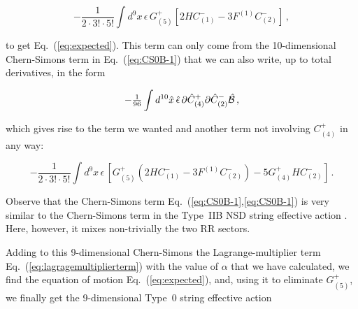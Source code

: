 \documentclass[12pt,a4paper]{article}
\begin{document}
\begin{equation}
-{\textstyle\frac{1}{2\cdot 3!\cdot5!}}\int d^{9}x\, \epsilon\, G^{+}_{(5)}
\left[2HC^{-}_{(1)}-3F^{(1)}C^{-}_{(2)}\right]\, ,
\end{equation}

\noindent to get Eq.~(\ref{eq:expected}). This term can only come
from the 10-dimensional Chern-Simons term in
Eq.~(\ref{eq:CS0B-1}) that we can also write, up to total derivatives,
in the form

\begin{equation}
\label{eq:CS0B-2}
-{\textstyle\frac{1}{96}} \int d^{10}\hat{x}\, 
\hat{\epsilon}\,
\partial\hat{C}^{+}_{(4)}\partial\hat{C}^{-}_{(2)}\hat{\cal B}\, ,
\end{equation}

\noindent which gives rise to the term we wanted and another term 
not involving $C^{+}_{(4)}$ in any way:

\begin{equation}
-{\textstyle\frac{1}{2\cdot 3!\cdot 5!}} \int d^{9}x\,
\epsilon\,
\left[G^{+}_{(5)}\left(2HC^{-}_{(1)} -3F^{(1)}C^{-}_{(2)}\right) 
-5G^{+}_{(4)}HC^{-}_{(2)}
\right]\, .
\end{equation}

Observe that the Chern-Simons term
Eq.~(\ref{eq:CS0B-1},\ref{eq:CS0B-1}) is very similar to the
Chern-Simons term in the Type~IIB NSD string effective action
\cite{kn:BBO,kn:MO}. Here, however, it mixes non-trivially the 
two RR sectors.

Adding to this 9-dimensional Chern-Simons the Lagrange-multiplier term
Eq.~(\ref{eq:lagragemultiplierterm}) with the value of $\alpha$ that
we have calculated, we find the equation of motion
Eq.~(\ref{eq:expected}), and, using it to eliminate $G^{+}_{(5)}$, we
finally get the 9-dimensional Type~0 string effective action
\end{document}
